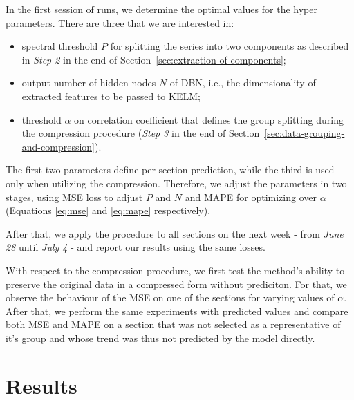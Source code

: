 In the first session of runs, we determine the optimal values for the hyper
parameters. There are three that we are interested in:
\begin{itemize}
	\item spectral threshold $P$ for splitting the series into two components as
	described in \textit{Step 2} in the end of
	Section~\ref{sec:extraction-of-components};
	\item output number of hidden nodes $N$ of DBN, i.e., the dimensionality of
	extracted features to be passed to KELM;
	\item threshold $\alpha$ on correlation coefficient that defines the group
	splitting during the compression procedure (\textit{Step 3} in the end of
	Section~\ref{sec:data-grouping-and-compression}).
\end{itemize}
The first two parameters define per-section prediction, while the third is used
only when utilizing the compression. Therefore, we adjust the parameters in two
stages, using MSE loss to adjust $P$ and $N$ and MAPE for optimizing over
$\alpha$ (Equations \ref{eq:mse} and \ref{eq:mape} respectively).

After that, we apply the procedure to all sections on the next week - from
\textit{June 28} until \textit{July 4} - and report our results using the same
losses.

With respect to the compression procedure, we first test the method's ability to
preserve the original data in a compressed form without prediciton. For that, we
observe the behaviour of the MSE on one of the sections for varying values of
$\alpha$. After that, we perform the same experiments with predicted
values and compare both MSE and MAPE on a section that was not selected as a
representative of it's group and whose trend was thus not predicted by the model
directly.


\section{Results}

